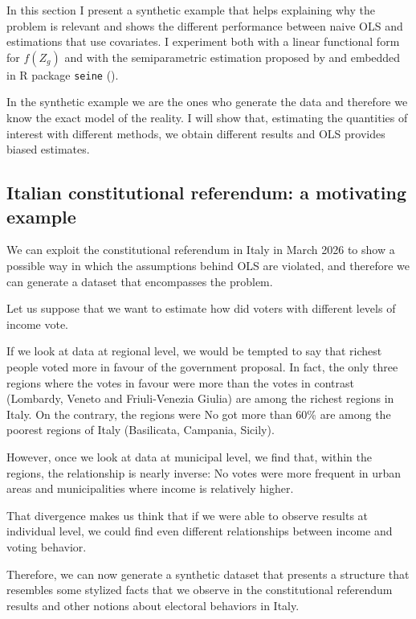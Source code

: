 In this section I present a synthetic example that helps explaining why the problem is relevant and shows the different performance between naive OLS and estimations that use covariates. I experiment both with a linear functional form for $f(Z_g)$ and with the semiparametric estimation proposed by \citet{mccartan2025identificationsemiparametricestimationconditional} and embedded in R package \texttt{seine} (\citet{seine}).

In the synthetic example we are the ones who generate the data and therefore we know the exact model of the reality.
I will show that, estimating the quantities of interest with different methods, we obtain different results and OLS provides biased estimates.

\subsection{Italian constitutional referendum: a motivating example}

We can exploit the constitutional referendum in Italy in March 2026 to show a possible way in which the assumptions behind OLS are violated, and therefore we can generate a dataset that encompasses the problem.

Let us suppose that we want to estimate how did voters with different levels of income vote.

If we look at data at regional level, we would be tempted to say that richest people voted more in favour of the government proposal. In fact, the only three regions where the votes in favour were more than the votes in contrast (Lombardy, Veneto and Friuli-Venezia Giulia) are among the richest regions in Italy. On the contrary, the regions were No got more than 60\% are among the poorest regions of Italy (Basilicata, Campania, Sicily).

However, once we look at data at municipal level, we find that, within the regions, the relationship is nearly inverse: No votes were more frequent in urban areas and municipalities where income is relatively higher.

That divergence makes us think that if we were able to observe results at individual level, we could find even different relationships between income and voting behavior.

Therefore, we can now generate a synthetic dataset that presents a structure that resembles some stylized facts that we observe in the constitutional referendum results and other notions about electoral behaviors in Italy.

